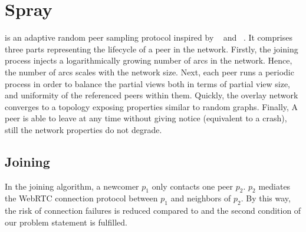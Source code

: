 
\section{Spray}
\label{sec:proposal}

\SPRAY{} is an adaptive random peer sampling protocol inspired by
\SCAMP{}~\cite{ganesh2003peer} and
\CYCLON{}~\cite{voulgaris2005cyclon}. It comprises three parts
representing the lifecycle of a peer in the network.  Firstly, the
joining process injects a logarithmically growing number of arcs in
the network. Hence, the number of arcs scales with the network size.
Next, each peer runs a periodic process in order to balance the
partial views both in terms of partial view size, and uniformity of
the referenced peers within them. Quickly, the overlay network
converges to a topology exposing properties similar to random
graphs. Finally, A peer is able to leave at any time without giving
notice (equivalent to a crash), still the network properties do not
degrade.

\subsection{Joining}



In the \SPRAY{} joining algorithm, a newcomer $p_1$ only contacts one
peer $p_2$. $p_2$ mediates the WebRTC connection protocol between $p_1$
and neighbors of $p_2$. By this way, the risk of connection failures is
reduced compared to \SCAMP{} and the second condition of our problem
statement is fulfilled.

